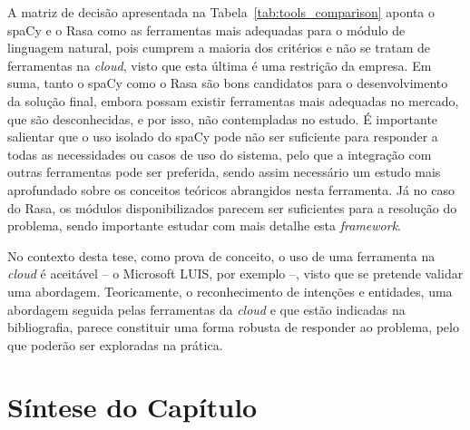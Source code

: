 A matriz de decisão apresentada na Tabela~\ref{tab:tools_comparison} aponta o spaCy e o Rasa como as ferramentas mais adequadas para o módulo de linguagem natural, pois cumprem a maioria dos critérios e não se tratam de ferramentas na \textit{cloud}, visto que esta última é uma restrição da empresa. Em suma, tanto o spaCy como o Rasa são bons candidatos para o desenvolvimento da solução final, embora possam existir ferramentas mais adequadas no mercado, que são desconhecidas, e por isso, não contempladas no estudo. É importante salientar que o uso isolado do spaCy pode não ser suficiente para responder a todas as necessidades ou casos de uso do sistema, pelo que a integração com outras ferramentas pode ser preferida, sendo assim necessário um estudo mais aprofundado sobre os conceitos teóricos abrangidos nesta ferramenta. Já no caso do Rasa, os módulos disponibilizados parecem ser suficientes para a resolução do problema, sendo importante estudar com mais detalhe esta \textit{framework}.

No contexto desta tese, como prova de conceito, o uso de uma ferramenta na \textit{cloud} é aceitável -- o Microsoft LUIS, por exemplo --, visto que se pretende validar uma abordagem. Teoricamente, o reconhecimento de intenções e entidades, uma abordagem seguida pelas ferramentas da \textit{cloud} e que estão indicadas na bibliografia, parece constituir uma forma robusta de responder ao problema, pelo que poderão ser exploradas na prática.

\section{Síntese do Capítulo}
\label{sec:chap03_chaptersummary}
